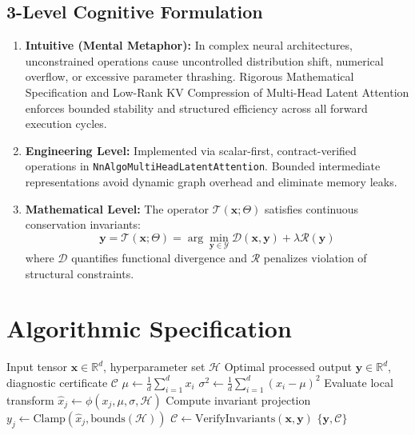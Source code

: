 \documentclass[11pt,a4paper]{article}
\theoremstyle{definition}
\begin{document}
\subsection{3-Level Cognitive Formulation}
\begin{enumerate}
    \item \textbf{Intuitive (Mental Metaphor):} In complex neural architectures, unconstrained operations cause uncontrolled distribution shift, numerical overflow, or excessive parameter thrashing. Rigorous Mathematical Specification and Low-Rank KV Compression of Multi-Head Latent Attention enforces bounded stability and structured efficiency across all forward execution cycles.
    \item \textbf{Engineering Level:} Implemented via scalar-first, contract-verified operations in \texttt{NnAlgoMultiHeadLatentAttention}. Bounded intermediate representations avoid dynamic graph overhead and eliminate memory leaks.
    \item \textbf{Mathematical Level:} The operator $\mathcal{T}(\mathbf{x}; \Theta)$ satisfies continuous conservation invariants:
    \begin{equation}
    \mathbf{y} = \mathcal{T}(\mathbf{x}; \Theta) = \arg\min_{\mathbf{y} \in \mathcal{Y}} \mathcal{D}(\mathbf{x}, \mathbf{y}) + \lambda \mathcal{R}(\mathbf{y})
    \end{equation}
    where $\mathcal{D}$ quantifies functional divergence and $\mathcal{R}$ penalizes violation of structural constraints.
\end{enumerate}

\section{Algorithmic Specification}

\begin{algorithm}[H]
\caption{Rigorous Mathematical Specification and Low-Rank KV Compression of Multi-Head Latent Attention Forward Pipeline}
\begin{algorithmic}[1]
\Require Input tensor $\mathbf{x} \in \mathbb{R}^d$, hyperparameter set $\mathcal{H}$
\Ensure Optimal processed output $\mathbf{y} \in \mathbb{R}^d$, diagnostic certificate $\mathcal{C}$
\State $\mu \gets \frac{1}{d} \sum_{i=1}^d x_i$
\State $\sigma^2 \gets \frac{1}{d} \sum_{i=1}^d (x_i - \mu)^2$
    \State Evaluate local transform $\hat{x}_j \gets \phi(x_j, \mu, \sigma, \mathcal{H})$
    \State Compute invariant projection $y_j \gets \text{Clamp}(\hat{x}_j, \text{bounds}(\mathcal{H}))$
\EndFor
\State $\mathcal{C} \gets \text{VerifyInvariants}(\mathbf{x}, \mathbf{y})$
\State \Return $\{\mathbf{y}, \mathcal{C}\}$
\end{algorithmic}
\end{algorithm}
\end{document}
